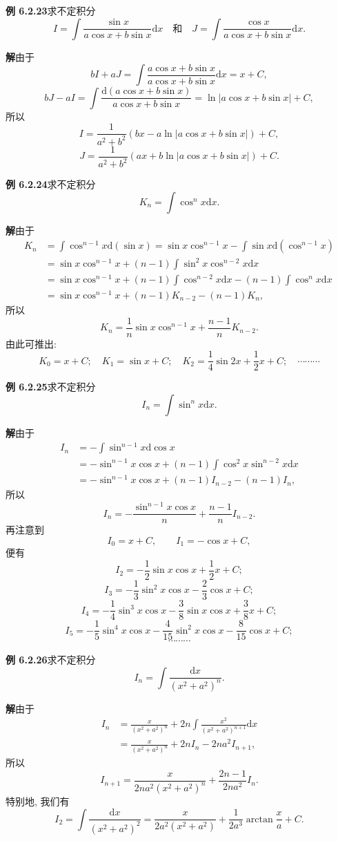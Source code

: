 \documentclass[UTF8, 12pt, fontset=fandol, oneside]{ctexart}
\begin{document}
\noindent\textbf{例 6.2.23}\quad 求不定积分
\[
  I=\int\frac{\sin x}{a\cos x+b\sin x}\mathrm dx
  \quad\text{和}\quad
  J=\int\frac{\cos x}{a\cos x+b\sin x}\mathrm dx.
\]

\noindent\textbf{解}\quad 由于
\[
  bI+aJ=
  \int\frac{a\cos x+b\sin x}{a\cos x+b\sin x}\mathrm dx
  =
  x+C,
\]
\[
  bJ-aI=
  \int\frac{\mathrm d(a\cos x+b\sin x)}{a\cos x+b\sin x}
  =
  \ln|a\cos x+b\sin x|+C,
\]
所以
\[
  I=\frac1{a^2+b^2}(bx-a\ln|a\cos x+b\sin x|)+C,
\]
\[
  J=\frac1{a^2+b^2}(ax+b\ln|a\cos x+b\sin x|)+C.
\]

\noindent\textbf{例 6.2.24}\quad 求不定积分
\[
  K_n=\int\cos^nx\mathrm dx.
\]

\noindent\textbf{解}\quad 由于
\[
\begin{aligned}
  K_n
  &=
  \int\cos^{n-1}x\mathrm d(\sin x)
  =
  \sin x\cos^{n-1}x-\int\sin x\mathrm d(\cos^{n-1}x)\\
  &=
  \sin x\cos^{n-1}x+(n-1)\int\sin^2x\cos^{n-2}x\mathrm dx\\
  &=
  \sin x\cos^{n-1}x+(n-1)\int\cos^{n-2}x\mathrm dx
  -(n-1)\int\cos^nx\mathrm dx\\
  &=
  \sin x\cos^{n-1}x+(n-1)K_{n-2}-(n-1)K_n,
\end{aligned}
\]
所以
\[
  K_n=\frac1n\sin x\cos^{n-1}x+\frac{n-1}nK_{n-2}.
\]
由此可推出:
\[
  K_0=x+C;\quad
  K_1=\sin x+C;\quad
  K_2=\frac14\sin2x+\frac12x+C;\quad
  \cdots\cdots\cdots
\]

\noindent\textbf{例 6.2.25}\quad 求不定积分
\[
  I_n=\int\sin^nx\mathrm dx.
\]

\noindent\textbf{解}\quad 由于
\[
\begin{aligned}
  I_n
  &=
  -\int\sin^{n-1}x\mathrm d\cos x\\
  &=
  -\sin^{n-1}x\cos x+(n-1)\int\cos^2x\sin^{n-2}x\mathrm dx\\
  &=
  -\sin^{n-1}x\cos x+(n-1)I_{n-2}-(n-1)I_n,
\end{aligned}
\]
所以
\[
  I_n=-\frac{\sin^{n-1}x\cos x}{n}+\frac{n-1}{n}I_{n-2}.
\]
再注意到
\[
  I_0=x+C,\qquad I_1=-\cos x+C,
\]
便有
\[
  I_2=-\frac12\sin x\cos x+\frac12x+C;
\]
\[
  I_3=-\frac13\sin^2x\cos x-\frac23\cos x+C;
\]
\[
  I_4=-\frac14\sin^3x\cos x-\frac38\sin x\cos x+\frac38x+C;
\]
\[
  I_5=-\frac15\sin^4x\cos x-\frac4{15}\sin^2x\cos x-\frac8{15}\cos x+C;
\]
\[
  \cdots\cdots\cdots
\]

\noindent\textbf{例 6.2.26}\quad 求不定积分
\[
  I_n=\int\frac{\mathrm dx}{(x^2+a^2)^n}.
\]

\noindent\textbf{解}\quad 由于
\[
\begin{aligned}
  I_n
  &=
  \frac{x}{(x^2+a^2)^n}
  +
  2n\int\frac{x^2}{(x^2+a^2)^{n+1}}\mathrm dx\\
  &=
  \frac{x}{(x^2+a^2)^n}
  +
  2nI_n-2na^2I_{n+1},
\end{aligned}
\]
所以
\[
  I_{n+1}=
  \frac{x}{2na^2(x^2+a^2)^n}+\frac{2n-1}{2na^2}I_n.
\]
特别地, 我们有
\[
  I_2=
  \int\frac{\mathrm dx}{(x^2+a^2)^2}
  =
  \frac{x}{2a^2(x^2+a^2)}+\frac1{2a^3}\arctan\frac xa+C.
\]
\end{document}
